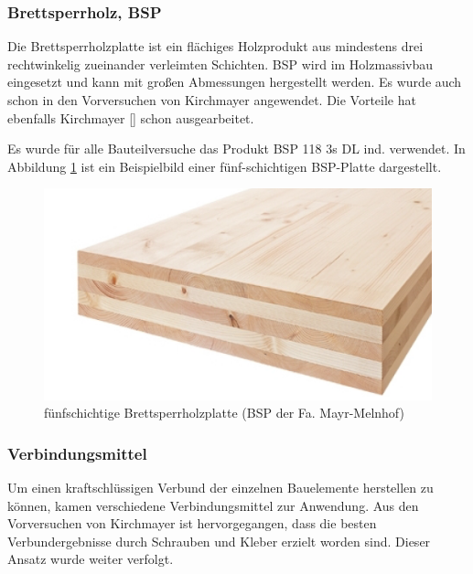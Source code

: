\subsubsection{Brettsperrholz, BSP}

Die Brettsperrholzplatte ist ein flächiges Holzprodukt aus mindestens drei rechtwinkelig zueinander verleimten Schichten. BSP wird im Holzmassivbau eingesetzt und kann mit großen Abmessungen hergestellt werden. Es wurde auch schon in den Vorversuchen von Kirchmayer angewendet. Die Vorteile hat ebenfalls  Kirchmayer [] schon ausgearbeitet.

Es wurde für alle Bauteilversuche das Produkt BSP 118 3s DL ind. verwendet. In Abbildung \ref{clt} ist ein Beispielbild einer fünf-schichtigen BSP-Platte dargestellt.

\begin{figure}[h]
\begin{center}
\includegraphics[scale =0.7]{Aufbau/bauteile/clt.png}
\caption{fünfschichtige Brettsperrholzplatte (BSP der Fa. Mayr-Melnhof)}
\label{clt}
\end{center}
\end{figure}

\subsubsection{Verbindungsmittel}

Um einen kraftschlüssigen Verbund der einzelnen Bauelemente herstellen zu können, kamen verschiedene Verbindungsmittel zur Anwendung. Aus den Vorversuchen von Kirchmayer ist hervorgegangen, dass die besten Verbundergebnisse durch Schrauben und Kleber  erzielt worden sind. Dieser Ansatz wurde weiter verfolgt.




